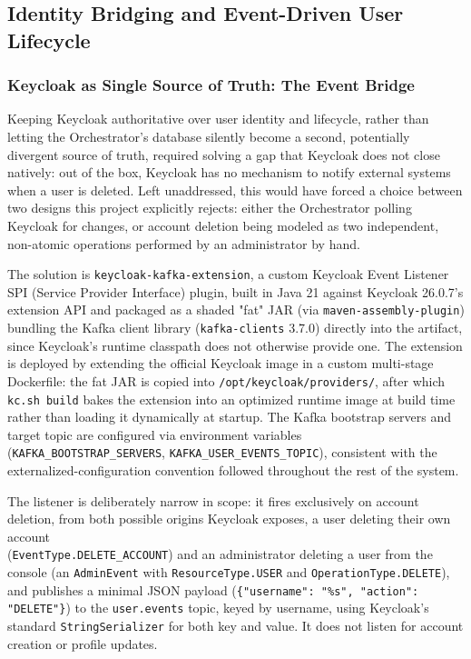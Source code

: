 \documentclass[twoside]{supsistudent}
\begin{document}
\subsection{Identity Bridging and Event-Driven User Lifecycle}

\subsubsection{Keycloak as Single Source of Truth: The Event Bridge}
Keeping Keycloak authoritative over user identity and lifecycle, rather than letting the Orchestrator's database silently become a second, potentially divergent source of truth, required solving a gap that Keycloak does not close natively: out of the box, Keycloak has no mechanism to notify external systems when a user is deleted. Left unaddressed, this would have forced a choice between two designs this project explicitly rejects: either the Orchestrator polling Keycloak for changes, or account deletion being modeled as two independent, non-atomic operations performed by an administrator by hand.

The solution is \texttt{keycloak-kafka-extension}, a custom Keycloak Event Listener SPI (Service Provider Interface) plugin, built in Java 21 against Keycloak 26.0.7's extension API and packaged as a shaded "fat" JAR (via \texttt{maven-assembly-plugin}) bundling the Kafka client library (\texttt{kafka-clients} 3.7.0) directly into the artifact, since Keycloak's runtime classpath does not otherwise provide one. The extension is deployed by extending the official Keycloak image in a custom multi-stage Dockerfile: the fat JAR is copied into \texttt{/opt/keycloak/providers/}, after which \texttt{kc.sh build} bakes the extension into an optimized runtime image at build time rather than loading it dynamically at startup. The Kafka bootstrap servers and target topic are configured via environment variables \\(\texttt{KAFKA\_BOOTSTRAP\_SERVERS}, \texttt{KAFKA\_USER\_EVENTS\_TOPIC}), consistent with the externalized-configuration convention followed throughout the rest of the system.

The listener is deliberately narrow in scope: it fires exclusively on account deletion, from both possible origins Keycloak exposes, a user deleting their own account \\ (\texttt{EventType.DELETE\_ACCOUNT}) and an administrator deleting a user from the console (an \texttt{AdminEvent} with \texttt{ResourceType.USER} and \texttt{OperationType.DELETE}), and publishes a minimal JSON payload (\texttt{\{"username": "\%s", "action": "DELETE"\}}) to the \texttt{user.events} topic, keyed by username, using Keycloak's standard \texttt{StringSerializer} for both key and value. It does not listen for account creation or profile updates.
\end{document}
